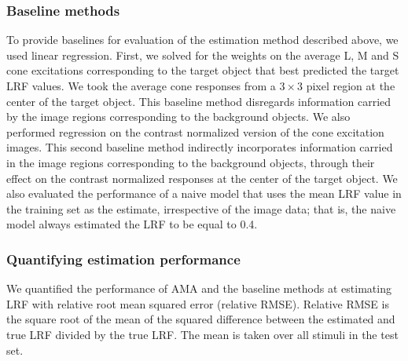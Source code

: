 \documentclass{jov}
\begin{document}
\subsubsection*{Baseline methods}
To provide baselines for evaluation of the estimation method described above, we used linear regression.
First, we solved for the weights on the average L, M and S cone excitations corresponding to the target object that best predicted the target LRF values.
We took the average cone responses from a $3 \times 3$ pixel region at the center of the target object.
This baseline method disregards information carried by the image regions corresponding to the background objects.
We also performed regression on the contrast normalized version of the cone excitation images.
This second baseline method indirectly incorporates information carried in the image regions corresponding to the background objects,
through their effect on the contrast normalized responses at the center of the target object. 
We also evaluated the performance of a naive model that uses the mean LRF value in the training set as the estimate, irrespective
of the image data; that is, the naive model always estimated the LRF to be equal to 0.4.

\subsubsection*{Quantifying estimation performance}
We quantified the performance of AMA and the baseline methods at estimating LRF with relative root mean squared error (relative RMSE). Relative RMSE is the square root of the mean of the squared difference between the estimated and true LRF divided by the true LRF. The mean is taken over all stimuli in the test set. 
\end{document}
